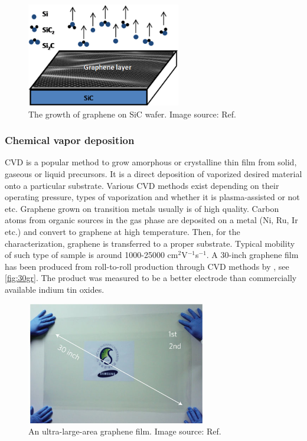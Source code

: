 \begin{figure}[htbp!] 
\centering  
\includegraphics[width=0.6\textwidth]{gr-sic.png}
\caption[The growth of graphene on SiC wafer]{The growth of graphene on SiC wafer. Image source: Ref. \cite{Mishra2016}}  
\label{fig:sic}
\end{figure} 

\subsubsection{Chemical vapor deposition}

CVD is a popular method to grow amorphous or crystalline thin film from solid, gaseous or liquid precursors. It is a direct deposition of vaporized desired material onto a particular substrate. Various CVD methods exist depending on their operating pressure, types of vaporization and whether it is plasma-assisted or not etc. Graphene grown on transition metals usually is of high quality. Carbon atoms from organic sources in the gas phase are deposited on a metal (Ni, Ru, Ir etc.) and convert to graphene at high temperature. Then, for the characterization, graphene is transferred to a proper substrate. Typical mobility of such type of sample is around 1000-25000 cm$^2$V$^{-1}$s$^{-1}$\cite{Petrone2012}. A 30-inch graphene film has been produced from roll-to-roll production through CVD methods by \citet{Bae2010}, see \autoref{fig:30gr}. The product was measured to be a better electrode than commercially available indium tin oxides.

\begin{figure}[htbp!] 
\centering  
\includegraphics[width=0.7\textwidth]{30-inches-gr.jpg}
\caption[An ultra-large-area graphene film]{An ultra-large-area graphene film. Image source: Ref. \cite{Bae2010}}  
\label{fig:30gr}
\end{figure} 

